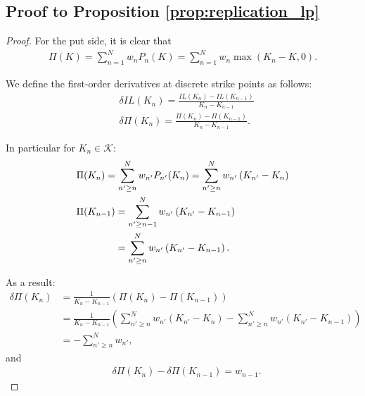 \documentclass[pdftex,11pt,a4paper] {article}
\begin{document}
\subsection{Proof to Proposition \protect\ref{prop:replication_lp}}

\label{sc:replication_lp}

\begin{proof}

For the put side, it is clear that
\begin{equation} \label{eq:ph6}
\begin{split}
\Pi(K) = \sum^{N}_{n=1}w_{n}P_{n}(K) =  \sum^{N}_{n=1}w_{n} \max \left(K_{n}-K, 0 \right).
\end{split}
\end{equation}

We define the first-order derivatives at discrete strike points as follows:
\begin{equation} \label{eq:ph6a}
\begin{split}
& \delta IL(K_{n}) = \frac{IL(K_{n})-IL(K_{n-1})}{K_{n}-K_{n-1}}\\
& \delta\Pi(K_{n} ) = \frac{\Pi(K_{n})-\Pi(K_{n-1})}{K_{n}-K_{n-1}}.
\end{split}
\end{equation}


In particular for $K_{n} \in \mathcal{K}$:
\begin{equation} \label{eq:ph7}
\begin{split}
& \Pi(K_{n}) = \sum^{N}_{n' \geq n}w_{n'}P_{n'}(K_{n}) =  \sum^{N}_{n' \geq n}w_{n'} \left(K_{n'}-K_{n} \right)\\
& \Pi(K_{n-1}) = \sum^{N}_{n' \geq n-1}w_{n'}\left(K_{n'}-K_{n-1}\right)\\
&\hphantom{\Pi(K_{n-1})} = \sum^{N}_{n' \geq n}w_{n'}\left(K_{n'}-K_{n-1}\right).
\end{split}
\end{equation}

As a result:
\begin{equation} \label{eq:ph8}
\begin{split}
 \delta\Pi(K_{n} ) & = \frac{1}{{K_{n}-K_{n-1}}} \left( \Pi(K_{n})-\Pi(K_{n-1})\right)\\
& = \frac{1}{{K_{n}-K_{n-1}}} \left( \sum^{N}_{n' \geq n}w_{n'} \left(K_{n'}-K_{n} \right) -\sum^{N}_{n' \geq n}w_{n'} \left(K_{n'}-K_{n-1} \right)\right)\\
& = - \sum^{N}_{n' \geq n}w_{n'},
\end{split}
\end{equation}
and
\begin{equation} \label{eq:ph9}
\begin{split}
& \delta \Pi(K_{n})- \delta \Pi(K_{n-1}) = w_{n-1}.
\end{split}
\end{equation}



\end{proof}
\end{document}
